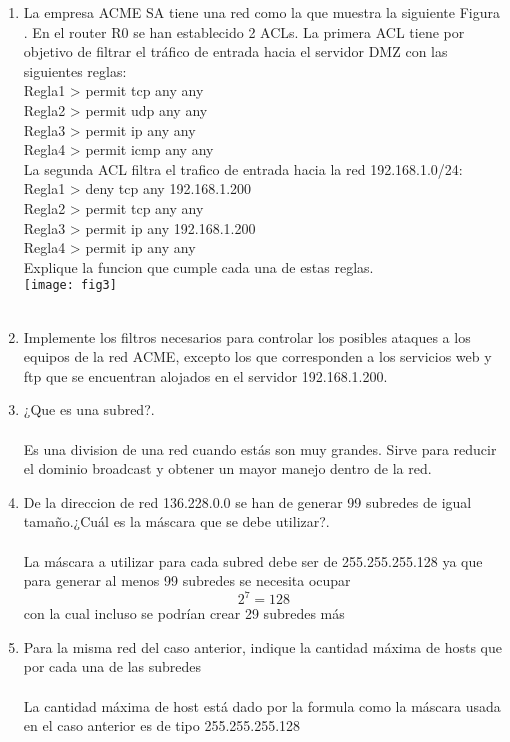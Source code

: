 \documentclass{udparticle}
\begin{document}
\begin{enumerate}
\item La empresa ACME SA tiene una red como la que muestra la siguiente Figura . 
En el router R0 se han establecido 2 ACLs. La primera ACL tiene por 
objetivo de filtrar el tráfico de entrada hacia el 
servidor DMZ con las siguientes reglas:\\
Regla1 > permit tcp any any\\
Regla2 > permit udp any any\\
Regla3 > permit ip any any\\
Regla4 > permit icmp any any\\
La segunda ACL filtra el trafico de entrada hacia la red 
192.168.1.0/24:\\
Regla1 > deny tcp any 192.168.1.200\\
Regla2 > permit tcp any any\\
Regla3 > permit ip any 192.168.1.200\\
Regla4 > permit ip any any\\
Explique la funcion que cumple cada una de estas reglas.\\
\texttt{[image: fig3]}\\\\
\item Implemente los filtros necesarios para controlar los posibles ataques a los equipos de la red ACME, excepto los que corresponden a los servicios web y ftp que se encuentran alojados en el
servidor 192.168.1.200.
\item ¿Que es una subred?.\\\\
Es una division de una red cuando estás 
son muy grandes. Sirve para reducir el 
dominio broadcast y obtener un mayor 
manejo dentro
de la red.
\item De la direccion de red 136.228.0.0 se han de generar 99 subredes de igual tamaño.¿Cuál es la máscara que se debe utilizar?.\\\\
La máscara a utilizar para cada subred debe ser de 255.255.255.128
ya que para generar al menos 99 subredes se necesita ocupar 
\[2^7=128\]
con la cual incluso se podrían crear 29 subredes más 
\item Para la misma red del caso anterior, indique la cantidad máxima de hosts que por cada una de las subredes\\\\
La cantidad máxima de host está dado por la formula
como la máscara usada en el caso anterior es de tipo 255.255.255.128



\end{enumerate}
\end{document}
